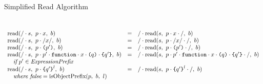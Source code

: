 \documentclass[preprint,10pt]{sigplanconf}
\begin{document}
\begin{displayfigure*}{\label{fig:simpleread}Simplified Read Algorithm}
\[\begin{array}{lcll}
    \\ \\

    \textrm{read}(/\cdot s,~p\cdot x,~b)
    &=&
    / \cdot 
      \textrm{read}(s,~
        p\cdot x\cdot /
      ,~b)
   
    \\
    \textrm{read}(/\cdot s,~p \cdot /x/,~b)
    &=&
    / \cdot 
      \textrm{read}(s,~
        p \cdot /x/ \cdot /
      ,~b)
   
    \\
    \textrm{read}(/\cdot s,~p \cdot \texttt{(}p'\texttt{)},~b)
    &=&
    / \cdot 
      \textrm{read}(s,~
        p \cdot \texttt{(}p'\texttt{)} \cdot /
      ,~b)
   
    \\
    \textrm{read}(/\cdot s,~
      p \cdot p' \cdot \texttt{function}\cdot x
      \cdot \texttt{(}q\texttt{)} \cdot \texttt{\{}q'\texttt{\}}
    ,~b)
    &=&
    / \cdot 
      \textrm{read}(s,~
        p \cdot p' \cdot \texttt{function}\cdot x \cdot \texttt{(}q\texttt{)}
        \cdot \texttt{\{}q'\texttt{\}} \cdot /
      ,~b)
   
    \\
    \quad \textit{if}~p' \in \textit{ExpressionPrefix}
    \\
    \textrm{read}(/\cdot s,~
      p \cdot \texttt{\{}q'\texttt{\}}^{l}
    ,~b)
    &=&
    / \cdot 
      \textrm{read}(s,~
        p \cdot \texttt{\{}q'\texttt{\}}^{l} \cdot /
      ,~b)
   
    \\
    \quad \textit{where false} = \textrm{isObjectPrefix}(p,~b,~l)

    \\ \\
    


\end{array}\]
\end{displayfigure*}
\end{document}
